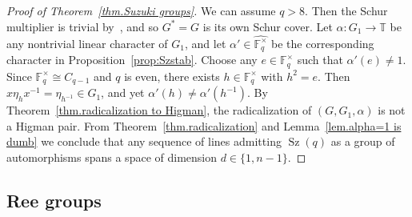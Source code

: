 \documentclass[11pt]{article}
\theoremstyle{definition}
\numberwithin{equation}{section}
\begin{document}
\begin{proof}[Proof of Theorem~\ref{thm.Suzuki groups}]
We can assume $q > 8$. 
Then the Schur multiplier is trivial by~\cite[Theorem~1]{AlperinGorenstein:66}, and so $G^* = G$ is its own Schur cover.
Let $\alpha \colon G_1 \to \mathbb{T}$ be any nontrivial linear character of $G_1$, and let $\alpha' \in \widehat{ \mathbb{F}_q^\times }$ be the corresponding character in Proposition~\ref{prop:Szstab}.
Choose any $e \in \mathbb{F}_q^\times$ such that $\alpha'(e) \neq 1$.
Since $\mathbb{F}_q^\times \cong C_{q-1}$ and $q$ is even, there exists $h \in \mathbb{F}_q^\times$ with $h^2 = e$.
Then $x \eta_h x^{-1} = \eta_{h^{-1}} \in G_1$, and yet $\alpha'(h) \neq \alpha'(h^{-1})$.
By Theorem~\ref{thm.radicalization to Higman}, the radicalization of $(G,G_1, \alpha)$ is not a Higman pair.
From Theorem~\ref{thm.radicalization} and Lemma~\ref{lem.alpha=1 is dumb} we conclude that any sequence of lines admitting $\operatorname{Sz}(q)$ as a group of automorphisms spans a space of dimension $d \in \{1,n-1\}$.
\end{proof}



\subsection{Ree groups}
\end{document}
